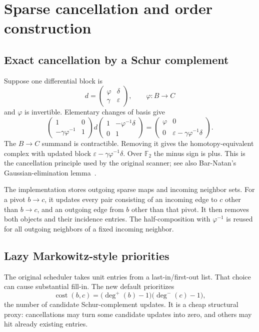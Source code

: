 \documentclass[11pt]{article}
\newcommand{\F}{\mathbb F}
\begin{document}
\section{Sparse cancellation and order construction}

\subsection{Exact cancellation by a Schur complement}

Suppose one differential block is
\[
 d=
 \begin{pmatrix}
 \varphi & \delta\\
 \gamma & \varepsilon
 \end{pmatrix},\qquad \varphi:B\longrightarrow C
\]
and $\varphi$ is invertible. Elementary changes of basis give
\[
 \begin{pmatrix}1&0\\-\gamma\varphi^{-1}&1\end{pmatrix}
 d
 \begin{pmatrix}1&-\varphi^{-1}\delta\\0&1\end{pmatrix}
 =
 \begin{pmatrix}\varphi&0\\0&
 \varepsilon-\gamma\varphi^{-1}\delta\end{pmatrix}.
\]
The $B\to C$ summand is contractible. Removing it gives the homotopy-equivalent
complex with updated block
$\varepsilon-\gamma\varphi^{-1}\delta$. Over $\F_2$ the minus sign is plus.
This is the cancellation principle used by the original scanner; see also
Bar-Natan's Gaussian-elimination lemma~\cite{barnatan}.

The implementation stores outgoing sparse maps and incoming neighbor sets.
For a pivot $b\to c$, it updates every pair consisting of an incoming edge to
$c$ other than $b\to c$, and an outgoing edge from $b$ other than that pivot.
It then removes both objects and their incidence entries. The half-composition
with $\varphi^{-1}$ is reused for all outgoing neighbors of a fixed incoming
neighbor.

\subsection{Lazy Markowitz-style priorities}

The original scheduler takes unit entries from a last-in/first-out list.
That choice can cause substantial fill-in. The new default prioritizes
\[
 \operatorname{cost}(b,c)=
 \bigl(\deg^+(b)-1\bigr)\bigl(\deg^-(c)-1\bigr),
\]
the number of candidate Schur-complement updates. It is a cheap structural
proxy: cancellations may turn some candidate updates into zero, and others
may hit already existing entries.
\end{document}
